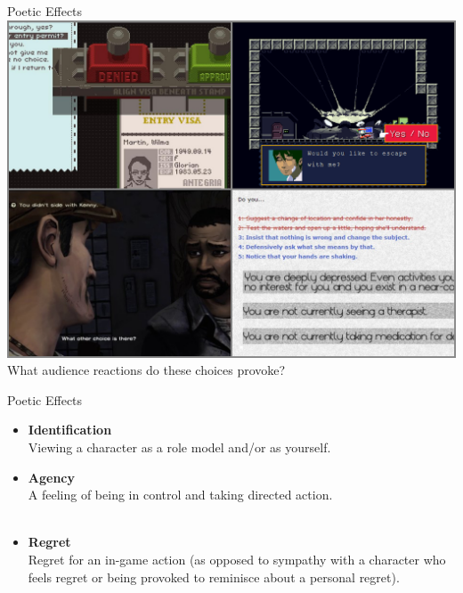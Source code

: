 \documentclass[xcolor=x11names]{beamer}
\begin{document}
\begin{frame}{Poetic Effects}
  \centering
  \includegraphics[height=0.8\textheight]{res/four-choices.png} \\
  \vspace{0.5ex}
  What audience reactions do these choices provoke?
\end{frame}

\begin{frame}{Poetic Effects}
  \begin{itemize}\addtolength{\itemsep}{0.5\baselineskip}
      \item \textbf{Identification} \\ \vspace{0.3\baselineskip}
      \small Viewing a character as a role model and/or as yourself.\\ \vspace{0.3\baselineskip}
      \tiny {}

    \item \normalsize \textbf{Agency} \\ \vspace{0.3\baselineskip}
      \small A feeling of being in control and taking directed action. \\ \vspace{0.3\baselineskip}
      \tiny {} \\
      \tiny {}

    \item \normalsize \textbf{Regret} \\ \vspace{0.3\baselineskip}
      \small Regret for an in-game action (as opposed to sympathy with a character who feels regret or being provoked to reminisce about a personal regret). \\ \vspace{0.3\baselineskip}
      \tiny {} \\
      \tiny {}
  \end{itemize}
\end{frame}
\end{document}
